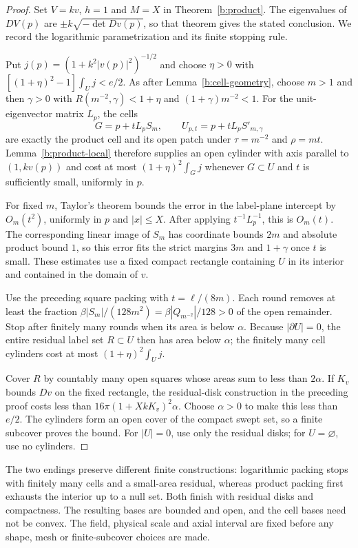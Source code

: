 \begin{proof}
Set $V=kv$, $h=1$ and $M=X$ in Theorem~\ref{b:product}.
The eigenvalues of $DV(p)$ are $\pm k\sqrt{-\det Dv(p)}$,
so that theorem gives the stated conclusion.  We record the
logarithmic parametrization and its finite stopping rule.

Put $j(p)=(1+k^2|v(p)|^2)^{-1/2}$ and choose $\eta>0$ with
$[(1+\eta)^2-1]\int_U j<e/2$.  As after
Lemma~\ref{b:cell-geometry}, choose $m>1$ and then $\gamma>0$
with $R(m^{-2},\gamma)<1+\eta$ and $(1+\gamma)m^{-2}<1$.
For the unit-eigenvector matrix $L_p$, the cells
\[
 G=p+tL_pS_m,\qquad U_{p,t}=p+tL_pS'_{m,\gamma}
\]
are exactly the product cell and its open patch under
$\tau=m^{-2}$ and $\rho=mt$.  Lemma~\ref{b:product-local}
therefore supplies an open cylinder with axis parallel to $(1,kv(p))$
and cost at most $(1+\eta)^2\int_G j$ whenever $G\subset U$
and $t$ is sufficiently small, uniformly in $p$.

For fixed $m$, Taylor's theorem bounds the error in the label-plane
intercept by $O_m(t^2)$, uniformly in $p$ and $|x|\le X$.
After applying $t^{-1}L_p^{-1}$, this is $O_m(t)$.  The
corresponding linear image of $S_m$ has coordinate bounds $2m$
and absolute product bound $1$, so
this error fits the strict margins $3m$ and $1+\gamma$ once $t$
is small.  These estimates use a fixed compact rectangle containing
$U$ in its interior and contained in the domain of $v$.

Use the preceding square packing with $t=\ell/(8m)$.
Each round removes at least the fraction
$\beta|S_m|/(128m^2)=\beta|Q_{m^{-2}}|/128>0$
of the open remainder.  Stop after finitely many rounds when its
area is below $\alpha$.  Because $|\partial U|=0$, the entire
residual label set $R\subset U$ then has area below $\alpha$;
the finitely many cell cylinders cost at most
$(1+\eta)^2\int_U j$.

Cover $R$ by countably many open squares whose areas sum to less
than $2\alpha$.
If $K_v$ bounds $Dv$ on the fixed rectangle, the residual-disk
construction in the preceding proof costs less than
$16\pi(1+XkK_v)^2\alpha$.  Choose $\alpha>0$ to make this less
than $e/2$.  The cylinders form an open cover of the compact swept
set, so a finite subcover proves the bound.  For $|U|=0$, use only
the residual disks; for $U=\varnothing$, use no cylinders.
\end{proof}

The two endings preserve different finite constructions: logarithmic
packing stops with finitely many cells and a small-area residual,
whereas product packing first exhausts the interior up to a null set.
Both finish with residual disks and compactness.  The resulting bases
are bounded and open, and the cell bases need not be convex.  The
field, physical scale and axial interval are fixed before any shape,
mesh or finite-subcover choices are made.

